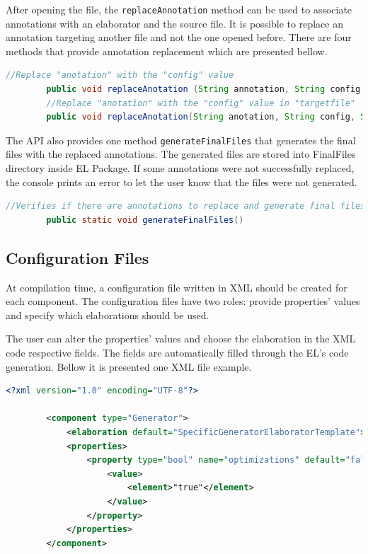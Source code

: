 \documentclass[11pt]{report}
\begin{document}
		\par After opening the file, the \texttt{replaceAnnotation} method can be used to associate annotations with an elaborator and the source file. It is possible to replace an annotation targeting another file and not the one opened before. There are four methods that provide annotation replacement which are presented bellow.
		
		\begin{lstlisting}[language=Java]
		//Replace "anotation" with the "config" value		
		public void replaceAnotation (String annotation, String config)
		//Replace "anotation" with the "config" value in "targetfile"
		public void replaceAnotation(String anotation, String config, String targetfile)
		\end{lstlisting}
		
		\par The API also provides one method \texttt{generateFinalFiles} that generates the final files with the replaced annotations. The generated files are stored into FinalFiles directory inside EL Package. If some annotations were not successfully replaced, the console prints an error to let the user know that the files were not generated.
		
		\begin{lstlisting}[language=Java]
		//Verifies if there are annotations to replace and generate final files
		public static void generateFinalFiles()
		\end{lstlisting}		
		
		\subsection{Configuration Files}
		
		\par At compilation time, a configuration file written in XML should be created for each component. The configuration files have two roles: provide properties' values and specify which elaborations should be used.
		\par The user can alter the properties' values and choose the elaboration in the XML code respective fields. The fields are automatically filled through the EL's code generation. Bellow it is presented one XML file example.
		
		\begin{lstlisting}[language=XML]
		<?xml version="1.0" encoding="UTF-8"?>
		
		<component type="Generator">
			<elaboration default="SpecificGeneratorElaboratorTemplate">SpecificGeneratorElaborator</elaboration>
			<properties>
				<property type="bool" name="optimizations" default="false"> 
					<value>
						<element>"true"</element>
					</value>
				</property>
			</properties>
		</component>
		\end{lstlisting}
		
\end{document}
